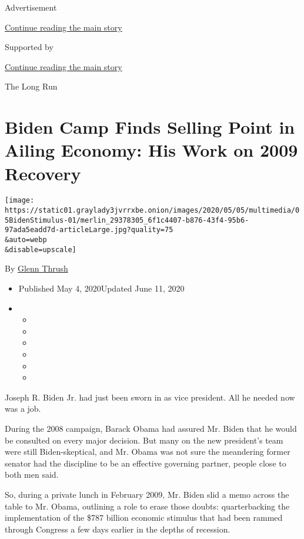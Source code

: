 Advertisement

\protect\hyperlink{after-top}{Continue reading the main story}

Supported by

\protect\hyperlink{after-sponsor}{Continue reading the main story}

The Long Run

\hypertarget{biden-camp-finds-selling-point-in-ailing-economy-his-work-on-2009-recovery}{%
\section{Biden Camp Finds Selling Point in Ailing Economy: His Work on
2009
Recovery}\label{biden-camp-finds-selling-point-in-ailing-economy-his-work-on-2009-recovery}}

\texttt{[image: https://static01.graylady3jvrrxbe.onion/images/2020/05/05/multimedia/05BidenStimulus-01/merlin\_29378305\_6f1c4407-b876-43f4-95b6-97ada5eadd7d-articleLarge.jpg?quality=75\\\&auto=webp\\\&disable=upscale]}

By \href{https://www.nytimes3xbfgragh.onion/by/glenn-thrush}{Glenn
Thrush}

\begin{itemize}
\item
  Published May 4, 2020Updated June 11, 2020
\item
  \begin{itemize}
  \item
  \item
  \item
  \item
  \item
  \item
  \end{itemize}
\end{itemize}

Joseph R. Biden Jr. had just been sworn in as vice president. All he
needed now was a job.

During the 2008 campaign, Barack Obama had assured Mr. Biden that he
would be consulted on every major decision. But many on the new
president's team were still Biden-skeptical, and Mr. Obama was not sure
the meandering former senator had the discipline to be an effective
governing partner, people close to both men said.

So, during a private lunch in February 2009, Mr. Biden slid a memo
across the table to Mr. Obama, outlining a role to erase those doubts:
quarterbacking the implementation of the \$787 billion economic stimulus
that had been rammed through Congress a few days earlier in the depths
of recession.

